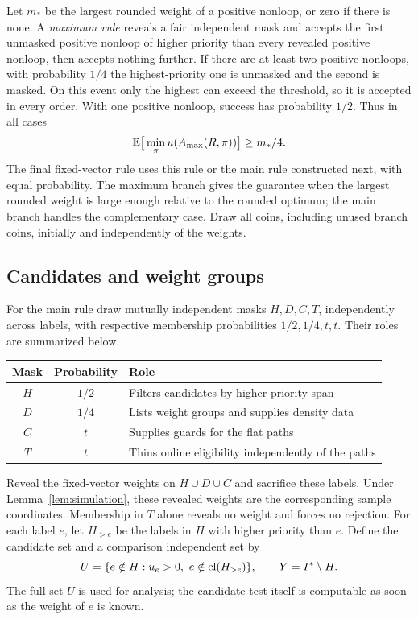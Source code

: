 Let $m_*$ be the largest rounded weight of a positive nonloop, or zero if
there is none. A \emph{maximum rule} reveals a fair independent mask and
accepts the first unmasked positive nonloop of higher priority than every
revealed positive nonloop, then accepts nothing further. If there are at
least two positive nonloops, with probability $1/4$ the highest-priority
one is unmasked and the second is masked. On this event only the highest
can exceed the threshold, so it is accepted in every order. With one
positive nonloop, success has probability $1/2$. Thus in all cases
\begin{equation}\label{eq:maximum}
 \mathbb E\big[\min_\pi u(A_{\mathrm{max}}(R,\pi))\big]\ge m_*/4.
\end{equation}
The final fixed-vector rule uses this rule or the main rule constructed
next, with equal probability. The maximum branch gives the guarantee when
the largest rounded weight is large enough relative to the rounded optimum;
the main branch handles the complementary case. Draw all coins, including unused branch
coins, initially and independently of the weights.

\subsection{Candidates and weight groups}

For the main rule draw mutually independent masks $H,D,C,T$, independently
across labels, with respective membership probabilities $1/2,1/4,t,t$.
Their roles are summarized below.
\begin{center}
\begin{tabular}{@{}ccl@{}}
\toprule
Mask & Probability & Role \\
\midrule
$H$ & $1/2$ & Filters candidates by higher-priority span \\
$D$ & $1/4$ & Lists weight groups and supplies density data \\
$C$ & $t$ & Supplies guards for the flat paths \\
$T$ & $t$ & Thins online eligibility independently of the paths \\
\bottomrule
\end{tabular}
\end{center}
Reveal the fixed-vector weights on $H\cup D\cup C$
and sacrifice these labels. Under Lemma~\ref{lem:simulation}, these revealed
weights are the corresponding sample coordinates.
Membership in $T$ alone reveals no weight and forces no rejection.
For each label $e$, let $H_{>e}$ be the labels in $H$ with higher priority
than $e$. Define the candidate set and a comparison independent set by
\begin{equation}\label{eq:candidates}
 U=\{e\notin H:u_e>0,\ e\notin\operatorname{cl}(H_{>e})\},
 \qquad Y=I^*\setminus H.
\end{equation}
The full set $U$ is used for analysis; the candidate test itself is
computable as soon as the weight of $e$ is known.

